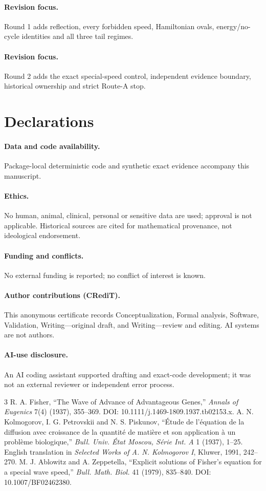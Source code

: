 \documentclass[9pt]{extarticle}
\begin{document}
\paragraph{Revision focus.} Round 1 adds reflection, every forbidden speed,
Hamiltonian ovals, energy/no-cycle identities and all three tail regimes.
\or
\paragraph{Revision focus.} Round 2 adds the exact special-speed control,
independent evidence boundary, historical ownership and strict Route-A stop.
\fi

\section*{Declarations}
\paragraph{Data and code availability.} Package-local deterministic code and
synthetic exact evidence accompany this manuscript.
\paragraph{Ethics.} No human, animal, clinical, personal or sensitive data
are used; approval is not applicable.  Historical sources are cited for
mathematical provenance, not ideological endorsement.
\paragraph{Funding and conflicts.} No external funding is reported; no
conflict of interest is known.
\paragraph{Author contributions (CRediT).} This anonymous certificate records
Conceptualization, Formal analysis, Software, Validation, Writing---original
draft, and Writing---review and editing.  AI systems are not authors.
\paragraph{AI-use disclosure.} An AI coding assistant supported drafting and
exact-code development; it was not an external reviewer or independent error
process.

\begin{thebibliography}{3}
 R. A. Fisher, ``The Wave of Advance of Advantageous Genes,''
\emph{Annals of Eugenics} 7(4) (1937), 355--369.
DOI: 10.1111/j.1469-1809.1937.tb02153.x.
 A. N. Kolmogorov, I. G. Petrovskii and N. S. Piskunov,
``Étude de l'équation de la diffusion avec croissance de la quantité de
matière et son application à un problème biologique,'' \emph{Bull. Univ.
État Moscou, Série Int. A} 1 (1937), 1--25.  English translation in
\emph{Selected Works of A. N. Kolmogorov I}, Kluwer, 1991, 242--270.
 M. J. Ablowitz and A. Zeppetella, ``Explicit solutions of
Fisher's equation for a special wave speed,'' \emph{Bull. Math. Biol.} 41
(1979), 835--840. DOI: 10.1007/BF02462380.
\end{thebibliography}
\end{document}
